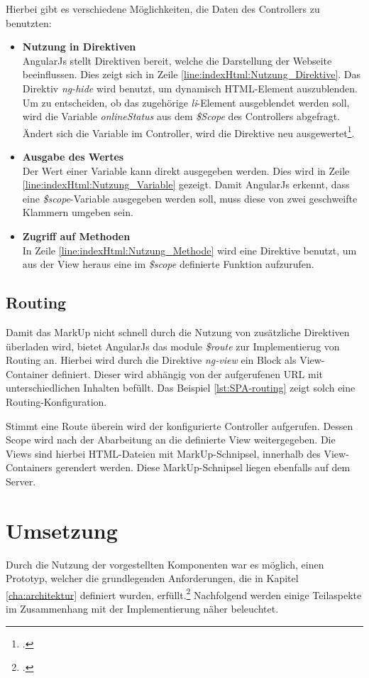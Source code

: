Hierbei gibt es verschiedene Möglichkeiten, die Daten des Controllers zu benutzten: 
\begin{itemize}
\item \textbf{Nutzung in Direktiven}\\
AngularJs stellt Direktiven bereit, welche die Darstellung der Webseite beeinflussen. Dies zeigt sich in Zeile \ref{line:indexHtml:Nutzung_Direktive}. Das Direktiv \textit{ng-hide} wird benutzt, um dynamisch HTML-Element auszublenden. Um zu entscheiden, ob das zugehörige \textit{li}-Element ausgeblendet werden soll, wird die Variable \textit{onlineStatus} aus dem \textit{\$Scope} des Controllers abgefragt. Ändert sich die Variable im Controller, wird die Direktive neu ausgewertet\footcite{online:angular:diretive}.
\item \textbf{Ausgabe des Wertes}\\
Der Wert einer Variable kann direkt ausgegeben werden. Dies wird in Zeile \ref{line:indexHtml:Nutzung_Variable} gezeigt. Damit AngularJs erkennt, dass eine \textit{\$scope}-Variable ausgegeben werden soll, muss diese von zwei geschweifte Klammern umgeben sein.
\item \textbf{Zugriff auf Methoden}\\
In Zeile \ref{line:indexHtml:Nutzung_Methode} wird eine Direktive benutzt, um aus der View heraus eine im \textit{\$scope} definierte Funktion aufzurufen.
\end{itemize}
\subsection{Routing}
\label{ssec:SPA-Routing}
Damit das MarkUp nicht schnell durch die Nutzung von zusätzliche Direktiven überladen wird, bietet AngularJs das module \textit{\$route} zur Implementierug von Routing an. Hierbei wird durch die Direktive \textit{ng-view} ein Block als View-Container definiert. Dieser wird abhängig von der aufgerufenen URL mit unterschiedlichen Inhalten befüllt. Das Beispiel \ref{lst:SPA-routing} zeigt solch eine Routing-Konfiguration. 

Stimmt eine Route überein wird der konfigurierte Controller aufgerufen. Dessen Scope wird nach der Abarbeitung an die definierte View weitergegeben. Die Views sind hierbei HTML-Dateien mit MarkUp-Schnipsel, innerhalb des View-Containers gerendert werden. Diese MarkUp-Schnipsel liegen ebenfalls auf dem Server. 
\section{Umsetzung}
\label{sec:SPA-Umsetzung}
Durch die Nutzung der vorgestellten Komponenten war es möglich, einen Prototyp, welcher die grundlegenden Anforderungen, die in Kapitel \ref{cha:architektur} definiert wurden, erfüllt.\footcite{online:Created_SPA} Nachfolgend werden einige Teilaspekte im Zusammenhang mit der Implementierung näher beleuchtet.
